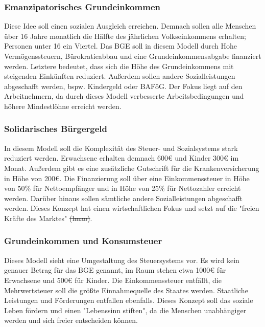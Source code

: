 \documentclass{article}
\begin{document}
	\subsubsection{Emanzipatorisches Grundeinkommen}
	Diese Idee soll einen sozialen Ausgleich erreichen. Demnach sollen alle Menschen über 16 Jahre monatlich die Hälfte des jährlichen Volkseinkommens erhalten; Personen unter 16 ein Viertel. Das BGE soll in diesem Modell durch Hohe Vermögenssteuern, Bürokratieabbau und eine Grundeinkommensabgabe finanziert werden. Letztere bedeutet, dass sich die Höhe des Grundeinkommens mit steigenden Einkünften reduziert. Außerdem sollen andere Sozialleistungen abgeschafft werden, bspw. Kindergeld oder BAFöG. Der Fokus liegt auf den Arbeitnehmern, da durch dieses Modell verbesserte Arbeitsbedingungen und höhere Mindestlöhne erreicht werden.

	\subsubsection{Solidarisches Bürgergeld}
	In diesem Modell soll die Komplexität des Steuer- und Sozialsystems stark reduziert werden. Erwachsene erhalten demnach 600€ und Kinder 300€ im Monat. Außerdem gibt es eine zusätzliche Gutschrift für die Krankenversicherung in Höhe von 200€. Die Finanzierung soll über eine Einkommenssteuer in Höhe von 50\% für Nettoempfänger und in Höhe von 25\% für Nettozahler erreicht werden. Darüber hinaus sollen sämtliche andere Sozialleistungen abgeschafft werden. Dieses Konzept hat einen wirtschaftlichen Fokus und setzt auf die "freien Kräfte des Marktes" \sout{(lmao)}.

	\subsubsection{Grundeinkommen und Konsumsteuer}
	Dieses Modell sieht eine Umgestaltung des Steuersystems vor. Es wird kein genauer Betrag für das BGE genannt, im Raum stehen etwa 1000€ für Erwachsene und 500€ für Kinder. Die Einkommenssteuer entfällt, die Mehrwertsteuer soll die größte Einnahmequelle des Staates werden. Staatliche Leistungen und Förderungen entfallen ebenfalls. Dieses Konzept soll das soziale Leben fördern und einen "Lebenssinn stiften", da die Menschen unabhängiger werden und sich freier entscheiden können.











	
\end{document}
